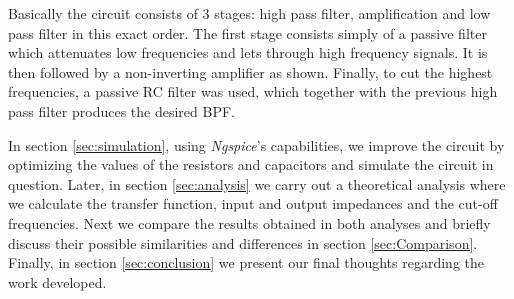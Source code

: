 Basically the circuit consists of 3 stages: high pass filter, amplification and low pass filter in this exact order.
The first stage consists simply of a passive filter which attenuates low frequencies and lets through high frequency signals.
It is then followed by a non-inverting amplifier as shown.
Finally, to cut the highest frequencies, a passive RC filter was used,
which together with the previous high pass filter produces the desired
BPF.


In section \ref{sec:simulation}, using \emph{Ngspice}'s capabilities,
we improve the circuit by optimizing the values of
the resistors and capacitors and simulate the circuit in question.
Later, in section \ref{sec:analysis} we carry out a theoretical
analysis where we calculate the transfer function, input and output impedances
and the cut-off frequencies. Next we compare the results obtained
in both analyses and briefly discuss their possible similarities and differences in section \ref{sec:Comparison}.
Finally, in section \ref{sec:conclusion} we present our final thoughts regarding the work developed.